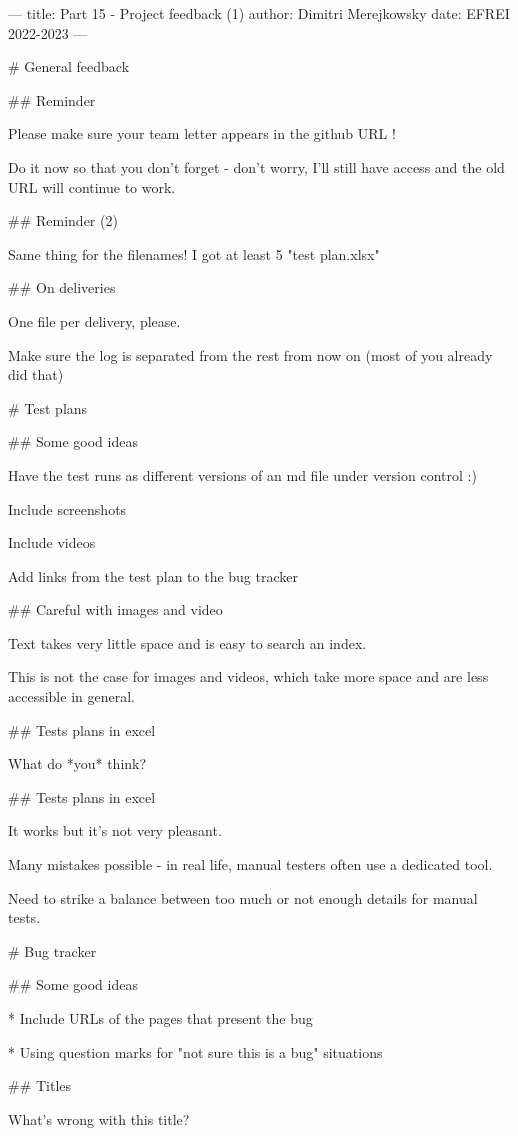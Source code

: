 ---
title: Part 15 - Project feedback (1)
author: Dimitri Merejkowsky
date: EFREI 2022-2023
---

# General feedback

## Reminder

Please make sure your team letter appears in the github URL !

Do it now so that you don't forget - don't worry, I'll still have access
and the old URL will continue to work.

## Reminder (2)

Same thing for the filenames! I got at least 5 "test plan.xlsx"

## On deliveries

One file per delivery, please.

Make sure the log is separated from the rest from now on
(most of you already did that)

# Test plans


## Some good ideas

Have the test runs as different versions of an md file under
version control :)

Include screenshots

Include videos

Add links from the test plan to the bug tracker

## Careful with images and video

Text takes very little space and is easy to search an index.

This is not the case for images and videos, which take more space
and are less accessible in general.

## Tests plans in excel

What do *you* think?

## Tests plans in excel

It works but it's not very pleasant.

Many mistakes possible - in real life, manual testers often use a
dedicated tool.

Need to strike a balance between too much or not enough details for
manual tests.

# Bug tracker

## Some good ideas

* Include URLs of the pages that present the bug

* Using question marks for "not sure this is a bug" situations

## Titles

What's wrong with this title?

